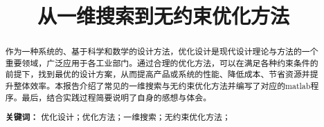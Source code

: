 \documentclass[12pt,a4paper,UTF8]{ctexart}
\begin{document}
\cover
\thispagestyle{empty} %
\newpage
{} %
\begin{center}
    \title{\bfseries \fontsize{22}{24} 从一维搜索到无约束优化方法}
\end{center}
\vspace{0.78cm}
\begin{abstract}\normalsize   %

作为一种系统的、基于科学和数学的设计方法，优化设计是现代设计理论与方法的一个重要领域，广泛应用于各工业部门。通过合理的优化方法，可以在满足各种约束条件的前提下，找到最优的设计方案，从而提高产品或系统的性能、降低成本、节省资源并提升整体效率。本报告介绍了常见的一维搜索与无约束优化方法并编写了对应的matlab程序。最后，结合实践过程简要说明了自身的感想与体会。

\vspace{1cm} %
\noindent \textbf{关键词：}
优化设计；优化方法；一维搜索；无约束优化方法；

\end{abstract}
\newpage
\begin{center}
    \tableofcontents
\end{center}
\newpage
{} %





\newpage

\end{document}
